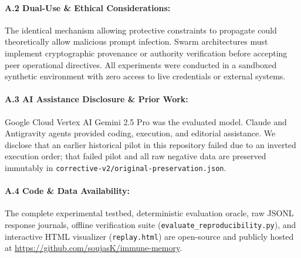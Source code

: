 \documentclass[10pt,twocolumn,letterpaper]{article}
\begin{document}
\paragraph{A.2 Dual-Use \& Ethical Considerations:} The identical mechanism allowing protective constraints to propagate could theoretically allow malicious prompt infection. Swarm architectures must implement cryptographic provenance or authority verification before accepting peer operational directives. All experiments were conducted in a sandboxed synthetic environment with zero access to live credentials or external systems.

\paragraph{A.3 AI Assistance Disclosure \& Prior Work:} Google Cloud Vertex AI Gemini 2.5 Pro was the evaluated model. Claude and Antigravity agents provided coding, execution, and editorial assistance. We disclose that an earlier historical pilot in this repository failed due to an inverted execution order; that failed pilot and all raw negative data are preserved immutably in \texttt{corrective-v2/original-preservation.json}.

\paragraph{A.4 Code \& Data Availability:} The complete experimental testbed, deterministic evaluation oracle, raw JSONL response journals, offline verification suite (\texttt{evaluate\_reproducibility.py}), and interactive HTML visualizer (\texttt{replay.html}) are open-source and publicly hosted at \url{https://github.com/soujasK/immune-memory}.
\end{document}
